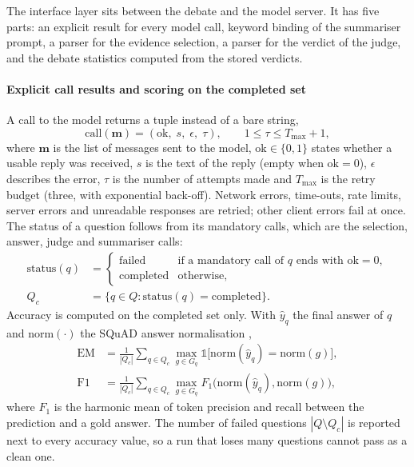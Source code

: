 The interface layer sits between the debate and the model server. It has five parts: an explicit result for every model call, keyword binding of the summariser prompt, a parser for the evidence selection, a parser for the verdict of the judge, and the debate statistics computed from the stored verdicts.

\paragraph{Explicit call results and scoring on the completed set}
A call to the model returns a tuple instead of a bare string,
\begin{equation}
\mathrm{call}(\mathbf{m}) = (\mathrm{ok},\; s,\; \epsilon,\; \tau), \qquad 1 \le \tau \le T_{\max}+1,
\label{eq:call}
\end{equation}
where $\mathbf{m}$ is the list of messages sent to the model, $\mathrm{ok}\in\{0,1\}$ states whether a usable reply was received, $s$ is the text of the reply (empty when $\mathrm{ok}=0$), $\epsilon$ describes the error, $\tau$ is the number of attempts made and $T_{\max}$ is the retry budget (three, with exponential back-off). Network errors, time-outs, rate limits, server errors and unreadable responses are retried; other client errors fail at once. The status of a question follows from its mandatory calls, which are the selection, answer, judge and summariser calls:
\begin{equation}
\begin{aligned}
\mathrm{status}(q) &=
\begin{cases}
\text{failed} & \text{if a mandatory call of } q \text{ ends with } \mathrm{ok}=0,\\
\text{completed} & \text{otherwise},
\end{cases}\\
Q_c &= \{q \in Q : \mathrm{status}(q)=\text{completed}\}.
\end{aligned}
\label{eq:status}
\end{equation}
Accuracy is computed on the completed set only. With $\hat y_q$ the final answer of $q$ and $\mathrm{norm}(\cdot)$ the SQuAD answer normalisation \cite{rajpurkar2016squad},
\begin{equation}
\begin{aligned}
\mathrm{EM} &= \frac{1}{|Q_c|}\sum_{q\in Q_c} \max_{g\in G_q} \mathbb{1}\big[\mathrm{norm}(\hat y_q)=\mathrm{norm}(g)\big],\\
\mathrm{F1} &= \frac{1}{|Q_c|}\sum_{q\in Q_c} \max_{g\in G_q} F_1\big(\mathrm{norm}(\hat y_q),\mathrm{norm}(g)\big),
\end{aligned}
\label{eq:emf1}
\end{equation}
where $F_1$ is the harmonic mean of token precision and recall between the prediction and a gold answer. The number of failed questions $|Q\setminus Q_c|$ is reported next to every accuracy value, so a run that loses many questions cannot pass as a clean one.

